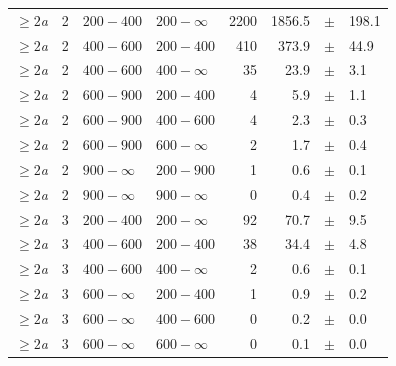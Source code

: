 \begin{table}[!h]
\begin{tabular}{rrllrrcl}
$\geq 2${\it a}\T & 2 & $ 200- 400$ & $200-\infty$ &   2200 &   1856.5 &$\pm$&  198.1 \\
$\geq 2${\it a}\T & 2 & $ 400- 600$ & $200-400$ &    410 &    373.9 &$\pm$&   44.9 \\
$\geq 2${\it a} & 2 & $ 400- 600$ & $400-\infty$ &     35 &     23.9 &$\pm$&    3.1 \\
$\geq 2${\it a}\T & 2 & $ 600- 900$ & $200-400$ &      4 &      5.9 &$\pm$&    1.1 \\
$\geq 2${\it a} & 2 & $ 600- 900$ & $400-600$ &      4 &      2.3 &$\pm$&    0.3 \\
$\geq 2${\it a} & 2 & $ 600- 900$ & $600-\infty$ &      2 &      1.7 &$\pm$&    0.4 \\
$\geq 2${\it a}\T & 2 & $ 900- \infty$ & $200-900$ &      1 &      0.6 &$\pm$&    0.1 \\
$\geq 2${\it a} & 2 & $ 900- \infty$ & $900-\infty$ &      0 &      0.4 &$\pm$&    0.2 \\
$\geq 2${\it a}\T & 3 & $ 200- 400$ & $200-\infty$ &     92 &     70.7 &$\pm$&    9.5 \\
$\geq 2${\it a}\T & 3 & $ 400- 600$ & $200-400$ &     38 &     34.4 &$\pm$&    4.8 \\
$\geq 2${\it a} & 3 & $ 400- 600$ & $400-\infty$ &      2 &      0.6 &$\pm$&    0.1 \\
$\geq 2${\it a}\T & 3 & $ 600- \infty$ & $200-400$ &      1 &      0.9 &$\pm$&    0.2 \\
$\geq 2${\it a} & 3 & $ 600- \infty$ & $400-600$ &      0 &      0.2 &$\pm$&    0.0 \\
$\geq 2${\it a} & 3 & $ 600- \infty$ & $600-\infty$ &      0 &      0.1 &$\pm$&    0.0 \\
    \hline
  \end{tabular}
\end{table}

